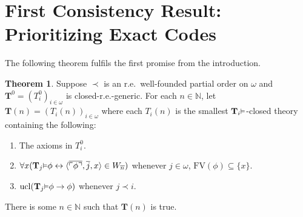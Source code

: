 \documentclass[reqno]{article}
\theoremstyle{definition}
\newtheorem{theorem}{Theorem}
\def\N{\mathbb{N}}
\def\T{\mathbf{T}}
\def\FV{\mathrm{FV}}
\renewcommand{\Pr}[1]{\T_{#1}\mbox{\small${\vDash}$}}
\newcommand{\ucl}[1]{\mathrm{ucl}(#1)}
\begin{document}
\section{First Consistency Result: Prioritizing Exact Codes}

The following theorem fulfils the first promise from the introduction.


\begin{theorem}
\label{onethreethree}
Suppose $\prec$ is an r.e.~well-founded
partial order on $\omega$
and $\T^0=(T^0_i)_{i\in \omega}$ is closed-r.e.-generic.
For each $n\in\N$,
let $\T(n)=(T_i(n))_{i\in \omega}$
where each $T_i(n)$ is the smallest $\Pr i$-closed theory
containing the following:
\begin{enumerate}
\item The axioms in $T^0_i$.
\item $\forall x(\Pr j\phi\leftrightarrow\langle\overline{\ulcorner\phi\urcorner},\overline j,x\rangle\in W_{\overline n})$
whenever $j\in\omega$, 
$\FV(\phi)\subseteq\{x\}$.
\item $\ucl{\Pr j\phi\rightarrow\phi}$ whenever $j\prec i$.
\end{enumerate}
There is some $n\in\N$ such that $\T(n)$ is true.
\end{theorem}
\end{document}
